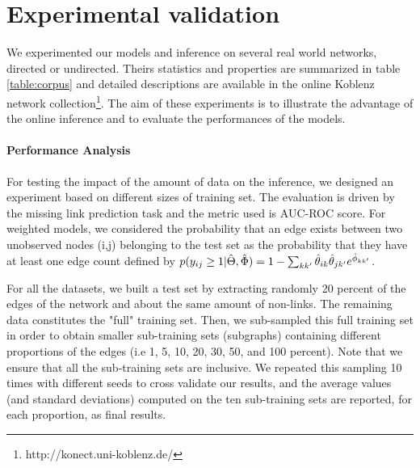\section{Experimental validation}
\label{sec:exps}

%
%


We experimented our models and inference on several real world networks,  directed or undirected. Theirs statistics and properties are summarized in table \ref{table:corpus} and detailed descriptions are available in the online Koblenz network collection\footnote{http://konect.uni-koblenz.de/}.
The aim of these experiments is to illustrate the advantage of the online inference and to evaluate the performances of the models.

\begin{table}[h]
\bgroup
\def\arraystretch{1} %
	
\egroup
\label{table:corpus}
\end{table}



%
%
\paragraph{Performance Analysis} For testing the impact of the amount of data on the inference, we designed an experiment based on different sizes of training set. The evaluation is driven by  the missing link prediction task and the metric used is AUC-ROC score. For weighted models, we considered the probability that an edge exists between two unobserved nodes (i,j) belonging to the test set as the probability that they have at least one edge count defined by $p(y_{ij} \geq 1 | \hat\Theta, \hat\Phi) = 1 - \sum_{kk'} \hat\theta_{ik} \hat\theta_{jk'} e^{\hat\phi_{kk'}}$.

For all the datasets, we built a test set by extracting randomly 20 percent of the edges of the network and about the same amount of non-links. The remaining data constitutes the "full" training set. Then, we sub-sampled this full training set in order to obtain smaller sub-training sets (subgraphs) containing different proportions of the edges (i.e 1, 5, 10, 20, 30, 50, and 100 percent). Note that we ensure that all the sub-training sets are inclusive. We repeated this sampling 10 times with different seeds to cross validate our results, and the average values (and standard deviations) computed on the ten sub-training sets are reported, for each proportion, as final results.

